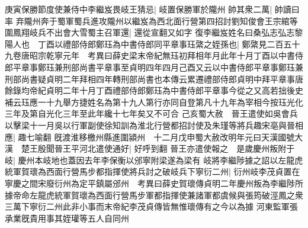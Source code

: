 庚寅保勝節度使兼侍中李繼岌畏岐王猜忌|{
	岐置保勝軍於隴州}
帥其衆二萬|{
	帥讀曰率}
弃隴州奔于蜀軍蜀兵進攻隴州以繼岌為西北面行營第四招討劉知俊會王宗綰等圍鳳翔岐兵不出會大雪蜀主召軍還|{
	還從宣翻又如字}
復李繼岌姓名曰桑弘志弘志黎陽人也　丁酉以禮部侍郎鄭珏為中書侍郎同平章事珏綮之姪孫也|{
	鄭綮見二百五十九卷唐昭宗乾寧元年　考異曰薛史梁末帝紀無珏初拜相年月此年十月丁酉以中書侍郎平章事鄭珏兼刑部尚書平章事至貞明四年四月己酉又云以中書侍郎平章事鄭珏兼刑部尚書疑貞明二年拜相四年轉刑部尚書也本傳云累遷禮部侍郎貞明中拜平章事唐餘錄均帝紀貞明二年十月丁酉禮部侍郎鄭珏為中書侍郎平章事今從之又高若拙後史補云珏應一十九舉方捷姓名為第十九人第行亦同自登第凡十九年為宰相今按珏光化三年及第自光化三年至此年纔十七年矣又不可合}
己亥蜀大赦　晉王遣使如吳會兵以擊梁十一月吳以行軍副使徐知訓為淮北行營都招討使及朱瑾等將兵趣宋亳與晉相應|{
	趣七喻翻}
旣渡淮移檄州縣進圍潁州　十二月戊申蜀大赦改明年元曰天漢國號大漢　楚王殷聞晉王平河北遣使通好|{
	好呼到翻}
晉王亦遣使報之　是歲慶州叛附于岐|{
	慶州本岐地也蓋因去年李保衡以邠寧附梁遂為梁有}
岐將李繼陟據之詔以左龍虎統軍賀瓌為西面行營馬步都指揮使將兵討之破岐兵下寧衍二州|{
	衍州岐李茂貞置在寧慶之間宋廢衍州為定平鎮屬邠州　考異曰薛史賀瓌傳貞明二年慶州叛為李繼陟所據帝命左龍虎統軍賀瓌為西面行營馬步軍都指揮使兼諸軍都虞候與張筠破涇鳳之衆三萬下寧衍二州此非小事而末帝紀李茂貞傳皆無惟瓌傳有之今以為據}
河東監軍張承業旣貴用事其姪瓘等五人自同州


